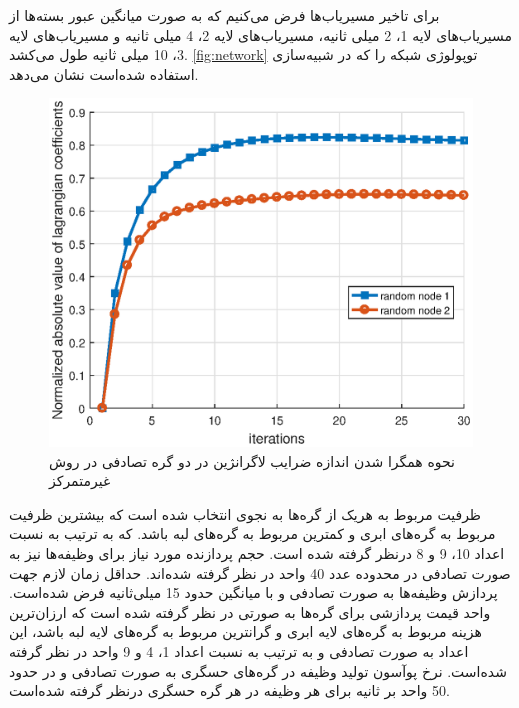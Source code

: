     برای تاخیر مسیریاب‌ها فرض می‌کنیم که به صورت میانگین عبور بسته‌ها از مسیریاب‌های لایه 1، 2 میلی ثانیه، مسیریاب‌های لایه 2، 4 میلی ثانیه و مسیریاب‌های لایه 3، 10 میلی ثانیه طول می‌کشد.
\cref{fig:network} توپولوژی شبکه را که در شبیه‌سازی استفاده شده‌است نشان می‌دهد.

\begin{figure}[h!]
	\centerline{\includegraphics[width=12cm]{graphics/3-cent-decent/decentralized_lagrangian_coeffs_convergence}}
	\caption{نحوه‌ همگرا شدن اندازه ضرایب لاگرانژین در دو گره تصادفی در روش غیرمتمرکز}
	\label{fig:decentralized_lagrangian_coeffs_convergence}
\end{figure}

ظرفیت مربوط به هریک از گره‌ها به نجوی انتخاب شده است که بیشترین ظرفیت مربوط به گره‌های ابری و کمترین مربوط به گره‌های لبه باشد. که به ترتیب به نسبت اعداد 10، 9 و 8 درنظر گرفته شده است. حجم پردازنده مورد نیاز برای وظیفه‌ها نیز به صورت تصادفی در محدوده عدد 40 واحد در نظر گرفته شده‌اند. حداقل زمان لازم جهت پردازش وظیفه‌ها به صورت تصادفی و با میانگین حدود 15 میلی‌ثانیه فرض شده‌است. واحد قیمت پردازشی برای گره‌ها به صورتی در نظر گرفته شده است که ارزان‌ترین هزینه مربوط به گره‌های لایه ابری و گرانترین مربوط به گره‌‌های لایه لبه باشد، این اعداد به صورت تصادفی و به ترتیب به نسبت اعداد 1، 4 و 9 واحد در نظر گرفته شده‌است. نرخ پوآسون تولید وظیفه در گره‌های حسگری به صورت تصادفی و در حدود 50 واحد بر ثانیه برای هر وظیفه در هر گره حسگری درنظر گرفته شده‌است. 

